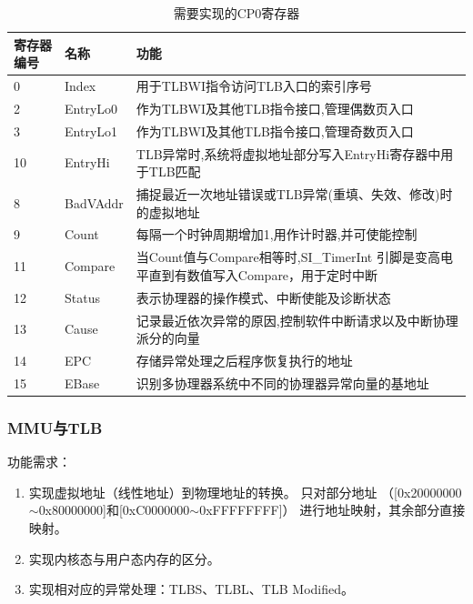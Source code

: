             \begin{table}
            \centering
            \caption{需要实现的CP0寄存器}\label{table_cp0_reg}
            \begin{tabularx}{\textwidth}{|l|l|X|}
            \hline
            寄存器编号 & 名称 & 功能 \\
            \hline
            0 & Index & 用于TLBWI指令访问TLB入口的索引序号 \\
            \hline
            2 & EntryLo0 & 作为TLBWI及其他TLB指令接口,管理偶数页入口 \\
            \hline
            3 & EntryLo1 & 作为TLBWI及其他TLB指令接口,管理奇数页入口 \\
            \hline
            10 & EntryHi & TLB异常时,系统将虚拟地址部分写入EntryHi寄存器中用于TLB匹配 \\
            \hline
            8 & BadVAddr & 捕捉最近一次地址错误或TLB异常(重填、失效、修改)时的虚拟地址 \\
            \hline
            9 & Count & 每隔一个时钟周期增加1,用作计时器,并可使能控制 \\
            \hline
            11 & Compare & 当Count值与Compare相等时,SI\_TimerInt 引脚是变高电平直到有数值写入Compare，用于定时中断 \\
            \hline
            12 & Status & 表示协理器的操作模式、中断使能及诊断状态 \\
            \hline
            13 & Cause & 记录最近依次异常的原因,控制软件中断请求以及中断协理派分的向量 \\
            \hline
            14 & EPC & 存储异常处理之后程序恢复执行的地址 \\
            \hline
            15 & EBase & 识别多协理器系统中不同的协理器异常向量的基地址 \\
            \hline
            \end{tabularx}
            \end{table}

        \subsubsection{MMU与TLB}
            功能需求：
            \begin{enumerate}
            \item
                实现虚拟地址（线性地址）到物理地址的转换。%
                只对部分地址%
                （[0x20000000$\sim$0x80000000]和[0xC0000000$\sim$0xFFFFFFFF]）%
                进行地址映射，其余部分直接映射。
            \item
                实现内核态与用户态内存的区分。
            \item
                实现相对应的异常处理：TLBS、TLBL、TLB Modified。
            \end{enumerate}

